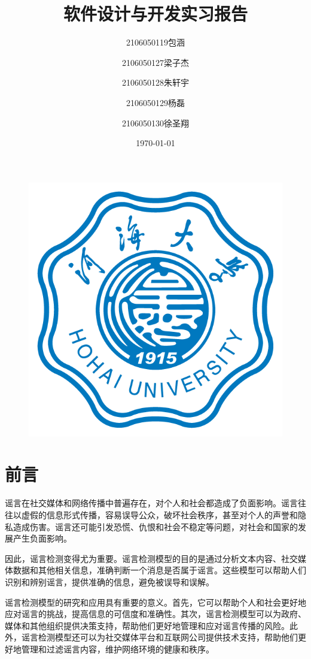 \documentclass{article}
\title{软件设计与开发实习报告}
\author[*]{2106050119包涵}
\author[*]{2106050127梁子杰}
\author[*]{2106050128朱轩宇}
\author[*]{2106050129杨磊}
\author[*]{2106050130徐圣翔}
\affil[*]{河海大学信息学部计算机与信息学院软件工程系}
\date{\today}
\begin{document}
\maketitle
\begin{figure}[H]
    \centering
    \includegraphics[scale=0.8]{pircture/xiaohui.png}
\end{figure}


\newpage
\tableofcontents
\newpage

\section{前言}
谣言在社交媒体和网络传播中普遍存在，对个人和社会都造成了负面影响。谣言往往以虚假的信息形式传播，容易误导公众，破坏社会秩序，甚至对个人的声誉和隐私造成伤害。谣言还可能引发恐慌、仇恨和社会不稳定等问题，对社会和国家的发展产生负面影响。

因此，谣言检测变得尤为重要。谣言检测模型的目的是通过分析文本内容、社交媒体数据和其他相关信息，准确判断一个消息是否属于谣言。这些模型可以帮助人们识别和辨别谣言，提供准确的信息，避免被误导和误解。

谣言检测模型的研究和应用具有重要的意义。首先，它可以帮助个人和社会更好地应对谣言的挑战，提高信息的可信度和准确性。其次，谣言检测模型可以为政府、媒体和其他组织提供决策支持，帮助他们更好地管理和应对谣言传播的风险。此外，谣言检测模型还可以为社交媒体平台和互联网公司提供技术支持，帮助他们更好地管理和过滤谣言内容，维护网络环境的健康和秩序。
\end{document}
